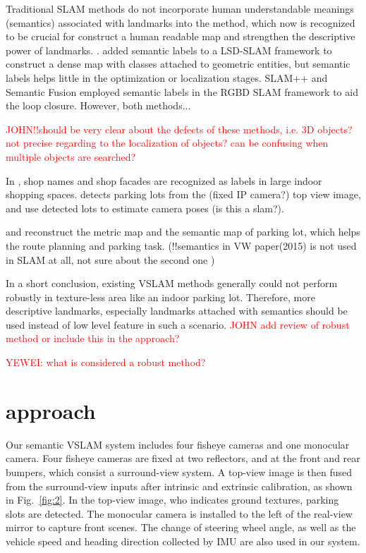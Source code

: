 \documentclass[journal]{IEEEtran}
\newcommand{\Reffig}[1]{Fig.~\ref{#1}}
\newcommand{\COMMENT}[1]{\textcolor{red}{#1}}
\begin{document}
Traditional SLAM methods do not incorporate human understandable meanings (semantics) associated with landmarks into the method, which now is recognized to be crucial for construct a human readable map and strengthen the descriptive power of landmarks\citep{}.
\cite{Cadena:2016fp}. \cite{Li2016Semi} added semantic labels to a LSD-SLAM framework to construct a dense map with classes attached to geometric entities, but semantic labels helps little in the optimization or localization stages.
SLAM++ \cite{Salas2013SLAM} and Semantic Fusion \cite{Mccormac2017SemanticFusion} employed semantic labels in the RGBD SLAM framework to aid the loop closure. 
However, both methods...

\COMMENT{JOHN!!should be very clear about the defects of these methods, i.e. 3D objects? not precise regarding to the localization of objects? can be confusing when multiple objects are searched?}

In \cite{Wang2015Lost}, shop names and shop facades are recognized as labels in large indoor shopping spaces. 
\cite{Houben:2015hq} detects parking lots from the (fixed IP camera?) top view image, and use detected lots to estimate camera poses (is this a slam?).

\cite{Grimmett2015Integrating} and \cite{Himstedt2017Online} reconstruct the metric map and the semantic map of parking lot, which helps the route planning and parking task.
(!!semantics in VW paper(2015) is not used in SLAM at all, not sure about the second one )

In a short conclusion, existing VSLAM methods generally could not perform robustly in texture-less area like an indoor parking lot.
Therefore, more descriptive landmarks, especially landmarks attached with semantics should be used instead of low level feature in such a scenario.
\COMMENT{JOHN add review of robust method or include this in the approach?}

\COMMENT{YEWEI: what is considered a robust method?}
\section{approach}

Our semantic VSLAM system includes four fisheye cameras and one monocular camera. 
Four fisheye cameras are fixed at two reflectors, and at the front and rear bumpers, which consist a surround-view system. 
A top-view image is then fused from the surround-view inputs after intrinsic and extrinsic calibration, as shown in \Reffig{fig:2}. 
In the top-view image, who indicates ground textures, parking slots are detected. 
The monocular camera is installed to the left of the real-view mirror to capture front scenes. 
The change of steering wheel angle, as well as the vehicle speed and heading direction collected by IMU are also used in our system.
\end{document}
